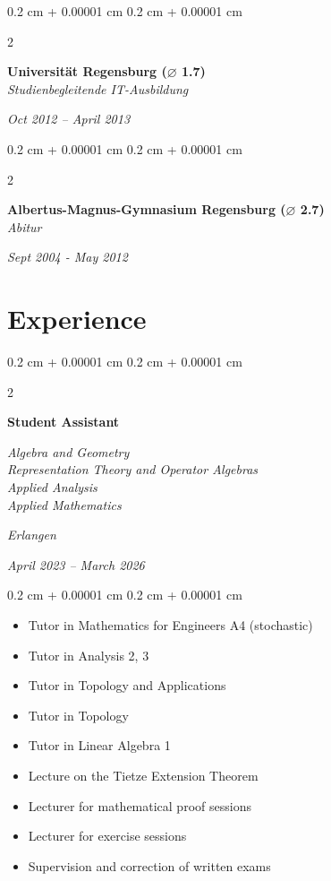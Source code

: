 \documentclass[10pt, letterpaper]{article}
\newenvironment{highlights}{
    \begin{itemize}[
        topsep=0.10 cm,
        parsep=0.10 cm,
        partopsep=0pt,
        itemsep=0pt,
        leftmargin=0.4 cm + 10pt
    ]
}{
    \end{itemize}
}
\newenvironment{onecolentry}{
    \begin{adjustwidth}{
        0.2 cm + 0.00001 cm
    }{
        0.2 cm + 0.00001 cm
    }
}{
    \end{adjustwidth}
}
\newenvironment{twocolentry}[2][]{
    \onecolentry
    \def\secondColumn{#2}
    \setcolumnwidth{\fill, 4.5 cm}
    \begin{paracol}{2}
}{
    \switchcolumn \raggedleft \secondColumn
    \end{paracol}
    \endonecolentry
}
\begin{document}
\vspace{0.10 cm}
\begin{twocolentry}{           
	\textit{Oct 2012 – April 2013}}
	\textbf{Universität Regensburg  ($\varnothing$ 1.7)} \\
	\textit{Studienbegleitende IT-Ausbildung}
\end{twocolentry}

\vspace{0.10 cm}
\begin{twocolentry}{           
	\textit{Sept 2004 - May 2012}}
	\textbf{Albertus-Magnus-Gymnasium Regensburg  ($\varnothing$ 2.7)} \\
	\textit{Abitur}
\end{twocolentry}



    
\section{Experience}
\begin{twocolentry}{
    \textit{Erlangen}    
    
    \textit{April 2023 – March 2026}}
    \textbf{Student Assistant}
    
    \textit{Algebra and Geometry \\ Representation Theory and Operator Algebras \\ Applied Analysis \\ Applied Mathematics}
\end{twocolentry}

\vspace{0.10 cm}
\begin{onecolentry}
	\begin{highlights}
		\item Tutor in Mathematics for Engineers A4 (stochastic)
        \item Tutor in Analysis 2, 3
        \item Tutor in Topology and Applications
        \item Tutor in Topology
        \item Tutor in Linear Algebra 1
        \item Lecture on the Tietze Extension Theorem
        \item Lecturer for mathematical proof sessions
        \item Lecturer for exercise sessions
        \item Supervision and correction of written exams
	\end{highlights}
\end{onecolentry}
\vspace{0.2 cm}
\end{document}
